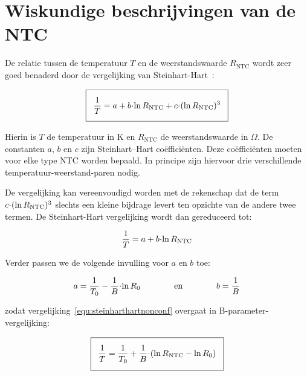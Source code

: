 \documentclass[12pt,a4paper,final,twoside,fleqn]{article}
\newcommand{\rntc}{R_\text{NTC}}
\let\oldcdot\cdot
\renewcommand{\cdot}{\kern-.10em\oldcdot\kern-.10em}
\begin{document}
\clearpage
\section{Wiskundige beschrijvingen van de NTC}
\label{sec:wiskundige}
De relatie tussen de temperatuur $T$ en de weerstandswaarde $\rntc$ wordt zeer
goed benaderd door de vergelijking van Steinhart-Hart~\cite{STEINHART1968497}:

\begin{equation}
\label{equ:steinharthart}
\setlength\fboxsep{2ex}
\boxed{\dfrac{1}{T} = a + b\cdot\ln \rntc + c\cdot( \ln \rntc )^3}
\end{equation}

Hierin is $T$ de temperatuur in K en $\rntc$ de weerstandswaarde in $\Omega$.
De constanten $a$, $b$ en $c$ zijn Steinhart–Hart co\"effici\"enten. Deze
co\"effici\"enten moeten voor elke type NTC worden bepaald. In principe
zijn hiervoor drie verschillende temperatuur-weerstand-paren nodig.

De vergelijking kan vereenvoudigd worden met de rekenschap dat de term
$c\cdot( \ln \rntc )^3$ slechts een kleine bijdrage levert ten opzichte van
de andere twee termen. De Steinhart-Hart vergelijking wordt dan gereduceerd
tot:

\begin{equation}
\label{equ:steinharthartnonconf}
\dfrac{1}{T} = a + b\cdot\ln \rntc 
\end{equation}

Verder passen we de volgende invulling voor $a$ en $b$ toe:

\begin{equation}
\label{equ:substaandb}
a = \dfrac{1}{T_0} - \dfrac{1}{B}\cdot \ln R_0 \qquad\qquad \text{en} \qquad\qquad
b = \dfrac{1}{B}
\end{equation}


zodat vergelijking~\eqref{equ:steinharthartnonconf} overgaat in B-parameter-vergelijking:

\begin{equation}
\label{equ:steinharthartsimpl}
\setlength\fboxsep{2ex}
\boxed{\dfrac{1}{T} = \dfrac{1}{T_0} + \dfrac{1}{B}\cdot (\ln\rntc - \ln R_0)}
\end{equation}
\end{document}
